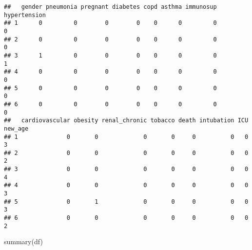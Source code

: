 \documentclass[
]{article}
\newenvironment{Shaded}{\begin{snugshade}}{\end{snugshade}}
\newcommand{\FunctionTok}[1]{\textcolor[rgb]{0.00,0.00,0.00}{#1}}
\newcommand{\NormalTok}[1]{#1}
\begin{document}
\begin{verbatim}
##   gender pneumonia pregnant diabetes copd asthma immunosup hypertension
## 1      0         0        0        0    0      0         0            0
## 2      0         0        0        0    0      0         0            0
## 3      1         0        0        0    0      0         0            1
## 4      0         0        0        0    0      0         0            0
## 5      0         0        0        0    0      0         0            0
## 6      0         0        0        0    0      0         0            0
##   cardiovascular obesity renal_chronic tobacco death intubation ICU new_age
## 1              0       0             0       0     0          0   0       3
## 2              0       0             0       0     0          0   0       2
## 3              0       0             0       0     0          0   0       4
## 4              0       0             0       0     0          0   0       3
## 5              0       1             0       0     0          0   0       3
## 6              0       0             0       0     0          0   0       2
\end{verbatim}

\begin{Shaded}
\begin{Highlighting}[]
\FunctionTok{summary}\NormalTok{(df)}
\end{Highlighting}
\end{Shaded}
\end{document}

